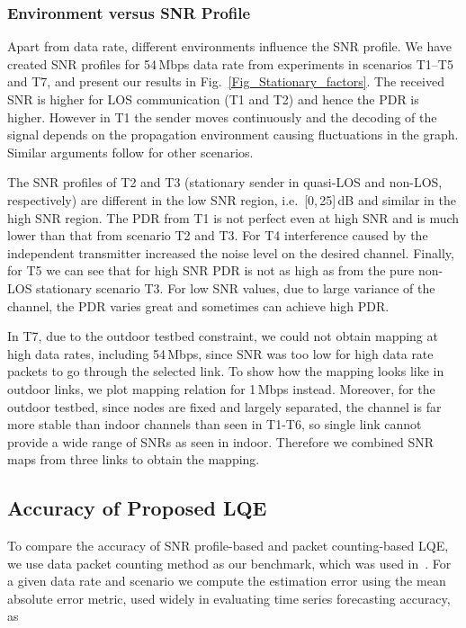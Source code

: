 \documentclass[11pt,draftclsnofoot,journal,onecolumn]{IEEEtran}
\begin{document}
\subsubsection{Environment versus SNR Profile}
\label{sec:env_vs_snr}

Apart from data rate, different environments influence the SNR profile. We have created SNR profiles for 54\,Mbps data rate from experiments in scenarios T1--T5 and T7, and present our results in Fig.~\ref{Fig_Stationary_factors}. The received SNR is higher for LOS communication (T1 and T2) and hence the PDR is higher. However in T1 the sender moves continuously and the decoding of the signal depends on the propagation environment causing fluctuations in the graph. Similar arguments follow for other scenarios.

The SNR profiles of T2 and T3 (stationary sender in quasi-LOS and non-LOS, respectively) are different in the low SNR region, i.e. \,[0,\,25]\,dB and similar in the high SNR region. The PDR from T1 is not perfect even at high SNR and is much lower than that from scenario T2 and T3. For T4 interference caused by the independent transmitter increased the noise level on the desired channel. Finally, for T5 we can see that for high SNR PDR is not as high as from the pure non-LOS stationary scenario T3. For low SNR values, due to large variance of the channel, the PDR varies great and sometimes can achieve high PDR.

In T7, due to the outdoor testbed constraint, we could not obtain mapping at high data rates, including 54\,Mbps, since SNR was too low for high data rate packets to go through the selected link. To show how the mapping looks like in outdoor links, we plot mapping relation for 1\,Mbps instead. Moreover, for the outdoor testbed, since nodes are fixed and largely separated, the channel is far more stable than indoor channels than seen in T1-T6, so single link cannot provide a wide range of SNRs as seen in indoor. Therefore we combined SNR maps from three links to obtain the mapping.

\subsection{Accuracy of Proposed LQE}
\label{sec:LQE accuracy}

To compare the accuracy of SNR profile-based and packet counting-based LQE, we use data packet counting method as our benchmark, which was used in~\cite{zhang_2009_tmc}. For a given data rate and scenario we compute the estimation error using the mean absolute error metric, used widely in evaluating time series forecasting accuracy, as
\end{document}
